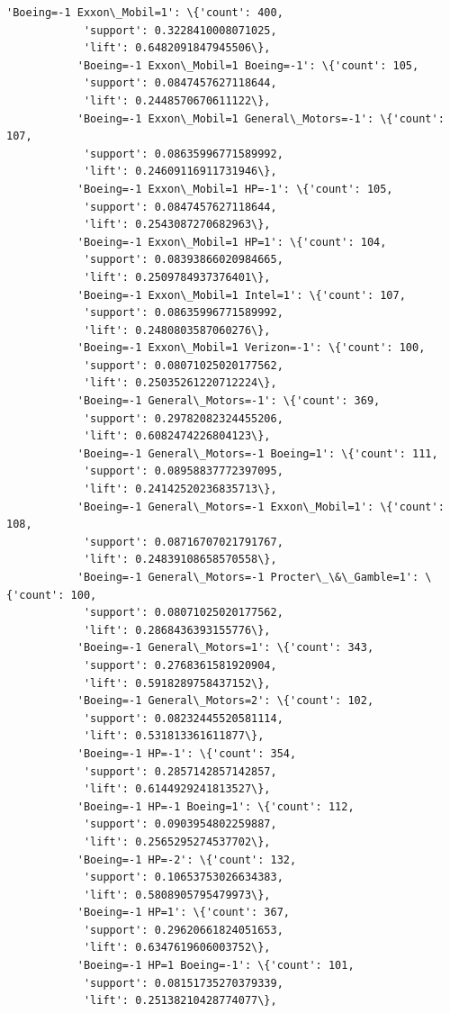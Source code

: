 \documentclass[11pt]{article}
\begin{document}
\begin{Verbatim}[commandchars=\\\{\}]
           'Boeing=-1 Exxon\_Mobil=1': \{'count': 400,
            'support': 0.3228410008071025,
            'lift': 0.6482091847945506\},
           'Boeing=-1 Exxon\_Mobil=1 Boeing=-1': \{'count': 105,
            'support': 0.0847457627118644,
            'lift': 0.2448570670611122\},
           'Boeing=-1 Exxon\_Mobil=1 General\_Motors=-1': \{'count': 107,
            'support': 0.08635996771589992,
            'lift': 0.24609116911731946\},
           'Boeing=-1 Exxon\_Mobil=1 HP=-1': \{'count': 105,
            'support': 0.0847457627118644,
            'lift': 0.2543087270682963\},
           'Boeing=-1 Exxon\_Mobil=1 HP=1': \{'count': 104,
            'support': 0.08393866020984665,
            'lift': 0.2509784937376401\},
           'Boeing=-1 Exxon\_Mobil=1 Intel=1': \{'count': 107,
            'support': 0.08635996771589992,
            'lift': 0.2480803587060276\},
           'Boeing=-1 Exxon\_Mobil=1 Verizon=-1': \{'count': 100,
            'support': 0.08071025020177562,
            'lift': 0.25035261220712224\},
           'Boeing=-1 General\_Motors=-1': \{'count': 369,
            'support': 0.29782082324455206,
            'lift': 0.6082474226804123\},
           'Boeing=-1 General\_Motors=-1 Boeing=1': \{'count': 111,
            'support': 0.08958837772397095,
            'lift': 0.24142520236835713\},
           'Boeing=-1 General\_Motors=-1 Exxon\_Mobil=1': \{'count': 108,
            'support': 0.08716707021791767,
            'lift': 0.24839108658570558\},
           'Boeing=-1 General\_Motors=-1 Procter\_\&\_Gamble=1': \{'count': 100,
            'support': 0.08071025020177562,
            'lift': 0.2868436393155776\},
           'Boeing=-1 General\_Motors=1': \{'count': 343,
            'support': 0.2768361581920904,
            'lift': 0.5918289758437152\},
           'Boeing=-1 General\_Motors=2': \{'count': 102,
            'support': 0.08232445520581114,
            'lift': 0.531813361611877\},
           'Boeing=-1 HP=-1': \{'count': 354,
            'support': 0.2857142857142857,
            'lift': 0.6144929241813527\},
           'Boeing=-1 HP=-1 Boeing=1': \{'count': 112,
            'support': 0.0903954802259887,
            'lift': 0.2565295274537702\},
           'Boeing=-1 HP=-2': \{'count': 132,
            'support': 0.10653753026634383,
            'lift': 0.5808905795479973\},
           'Boeing=-1 HP=1': \{'count': 367,
            'support': 0.29620661824051653,
            'lift': 0.6347619606003752\},
           'Boeing=-1 HP=1 Boeing=-1': \{'count': 101,
            'support': 0.08151735270379339,
            'lift': 0.25138210428774077\},

\end{Verbatim}
\end{document}
